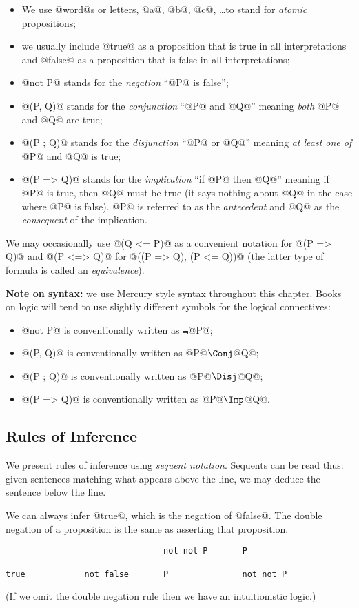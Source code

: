 \begin{itemize}
\item We use @word@s or letters, @a@, @b@, @c@, \ldots to stand for
\emph{atomic} propositions;
\item we usually include @true@ as a proposition that is true in all
interpretations and @false@ as a proposition that is false in all
interpretations;
\item @not P@ stands for the \emph{negation} ``@P@ is false'';
\item @(P, Q)@ stands for the \emph{conjunction} ``@P@ and @Q@'' meaning
\emph{both} @P@ and @Q@ are true;
\item @(P ; Q)@ stands for the \emph{disjunction} ``@P@ or @Q@'' meaning
\emph{at least one of} @P@ and @Q@ is true;
\item @(P => Q)@ stands for the \emph{implication} ``if @P@ then @Q@''
meaning if @P@ is true, then @Q@ must be true (it says nothing about @Q@
in the case where @P@ is false).  @P@ is referred to as the
\emph{antecedent} and @Q@ as the \emph{consequent} of the implication.
\end{itemize}

We may occasionally use @(Q <= P)@ as a convenient notation for
@(P => Q)@ and @(P <=> Q)@ for @((P => Q), (P <= Q))@ (the latter type
of formula is called an \emph{equivalence}).

\textbf{Note on syntax:} we use Mercury style syntax throughout this
chapter.  Books on logic will tend to use slightly different symbols for
the logical connectives:
\begin{itemize}
\item @not P@ is conventionally written as $\Not$@P@;
\item @(P, Q)@ is conventionally written as @P@$\Conj$@Q@;
\item @(P ; Q)@ is conventionally written as @P@$\Disj$@Q@;
\item @(P => Q)@ is conventionally written as @P@$\Imp$@Q@.
\end{itemize}

\subsection{Rules of Inference}

We present rules of inference using \emph{sequent notation}.  Sequents
can be read thus: given sentences matching what appears above the line,
we may deduce the sentence below the line.

We can always infer @true@, which is the negation of @false@.
The double negation of a proposition is the same as asserting that
proposition.
\begin{verbatim}
                                not not P       P
-----           ----------      ----------      ----------
true            not false       P               not not P
\end{verbatim}
(If we omit the double negation rule then we have an intuitionistic
logic.)


